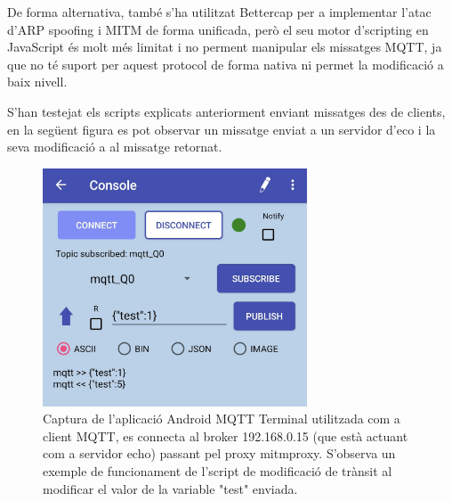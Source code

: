   De forma alternativa, també s'ha utilitzat Bettercap per a implementar l'atac d'ARP spoofing i MITM de forma unificada, però el seu motor d'scripting en JavaScript és molt més limitat i no perment manipular els missatges MQTT, ja que no té suport per aquest protocol de forma nativa ni permet la modificació a baix nivell.

  S'han testejat els scripts explicats anteriorment enviant missatges des de clients, en la següent figura es pot observar un missatge enviat a un servidor d'eco i la seva modificació a al missatge retornat. 
    \begin{figure}[H]
    \centering
    \includegraphics[width=0.7\textwidth]{img/captmqttclient.jpg}
    \caption{Captura de l'aplicació Android MQTT Terminal utilitzada com a client MQTT, es connecta al broker 192.168.0.15 (que està actuant com a servidor echo) passant pel proxy mitmproxy. S'observa un exemple de funcionament de l'script de modificació de trànsit al modificar el valor de la variable "test" enviada.}
    \label{fig:MqttClientCapt}
  \end{figure}